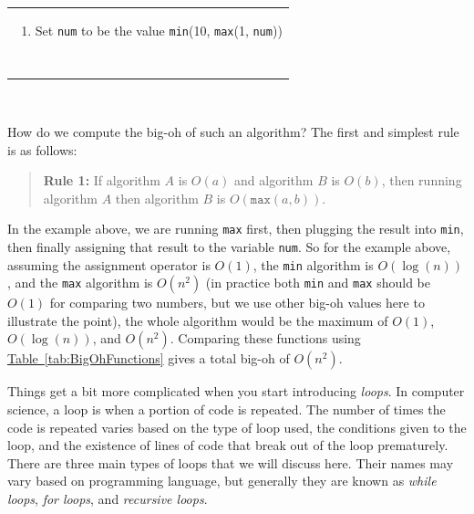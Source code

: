 \documentclass[11pt,oneside]{book}
\theoremstyle{definition}
\begin{document}
\

\begin{tabular}{|p{\textwidth}|}
\hline
\begin{enumerate}[topsep=0pt]
    \item Set \texttt{num} to be the value \texttt{min}(10, \texttt{max}(1, \texttt{num}))
\end{enumerate} \\
\ \\
\hline
\end{tabular}

\

How do we compute the big-oh of such an algorithm?
The first and simplest rule is as follows:
\begin{quote}
    \textbf{Rule 1:} If algorithm $A$ is $O(a)$ and algorithm $B$ is $O(b)$, then running algorithm $A$ then algorithm $B$ is $O(\texttt{max}(a, b))$. \label{quote:Rule1}
\end{quote}
In the example above, we are running \texttt{max} first, then plugging the result into \texttt{min}, then finally assigning that result to the variable \texttt{num}.
So for the example above, assuming the assignment operator is $O(1)$, the \texttt{min} algorithm is $O(\log(n))$, and the \texttt{max} algorithm is $O(n^{2})$ (in practice both \texttt{min} and \texttt{max} should be $O(1)$ for comparing two numbers, but we use other big-oh values here to illustrate the point), the whole algorithm would be the maximum of $O(1)$, $O(\log(n))$, and $O(n^{2})$.
Comparing these functions using \hyperref[tab:BigOhFunctions]{Table~\ref*{tab:BigOhFunctions}} gives a total big-oh of $O(n^{2})$.

Things get a bit more complicated when you start introducing \emph{loops}.
In computer science, a loop is when a portion of code is repeated.
The number of times the code is repeated varies based on the type of loop used, the conditions given to the loop, and the existence of lines of code that break out of the loop prematurely.
There are three main types of loops that we will discuss here.
Their names may vary based on programming language, but generally they are known as \emph{while loops}, \emph{for loops}, and \emph{recursive loops}.
\end{document}
